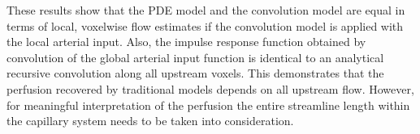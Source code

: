 \documentclass[final,5p,times,twocolumn]{elsarticle}
\begin{document}
These results show that the PDE model and the convolution model are equal in terms of local, voxelwise flow estimates if the convolution model is applied with the local arterial input. 
Also, the impulse response function obtained by convolution of the global arterial input function is identical to an analytical recursive convolution along all upstream voxels. 
This demonstrates that the perfusion recovered by traditional models depends on all upstream flow.
However, for meaningful interpretation of the perfusion the entire streamline length within the capillary system needs to be taken into consideration.
\end{document}
